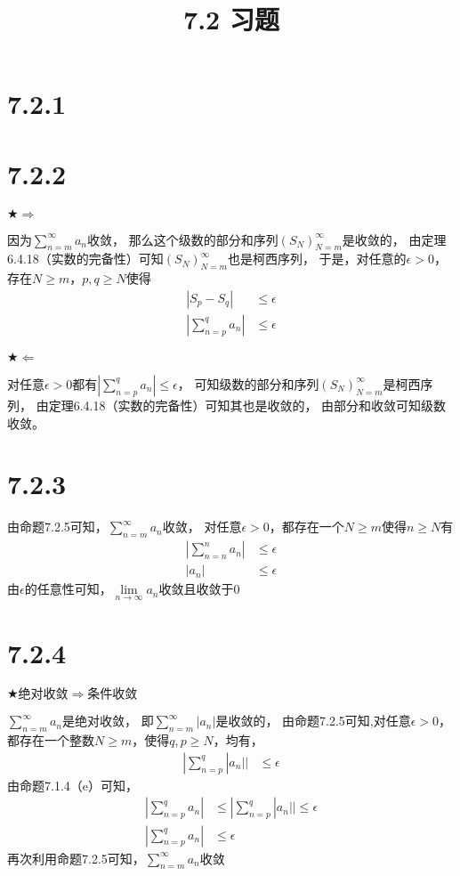 \documentclass{article}
\theoremstyle{mystyle}
\begin{document}
\title{7.2 习题}
\maketitle

\section*{7.2.1}

\section*{7.2.2}

$\bigstar \Rightarrow$

因为$\sum \limits_{n=m} ^{\infty} a_n$收敛，
那么这个级数的部分和序列$(S_N)_{N=m}^{\infty}$是收敛的，
由定理6.4.18（实数的完备性）可知$(S_N)_{N=m}^{\infty}$也是柯西序列，
于是，对任意的$\epsilon > 0$，存在$N \geq m$，$p,q \geq N$使得
\begin{align}
  |S_p - S_q|                & \leq \epsilon \\
  |\sum \limits_{n=p}^q a_n| & \leq \epsilon
\end{align}

$\bigstar \Leftarrow$

对任意$\epsilon > 0$都有$|\sum \limits_{n=p}^q a_n| \leq \epsilon$，
可知级数的部分和序列$(S_N)_{N=m}^{\infty}$是柯西序列，
由定理6.4.18（实数的完备性）可知其也是收敛的，
由部分和收敛可知级数收敛。

\section*{7.2.3}

由命题7.2.5可知，$\sum \limits_{n=m} ^{\infty} a_n$收敛，
对任意$\epsilon > 0$，都存在一个$N \geq m$使得$n \geq N$有
\begin{align*}
  |\sum \limits_{n=n}^n a_n| & \leq \epsilon \\
  |a_n|                      & \leq \epsilon
\end{align*}
由$\epsilon$的任意性可知，$\lim \limits_{n \to \infty} a_n$收敛且收敛于$0$


\section*{7.2.4}

$\bigstar \text{绝对收敛} \Rightarrow \text{条件收敛}$

$\sum \limits_{n=m} ^{\infty} a_n$是绝对收敛，
即$\sum \limits_{n=m} ^{\infty} |a_n|$是收敛的，
由命题7.2.5可知,对任意$\epsilon > 0$，都存在一个整数$N \geq m$，使得$q,p \geq N$，均有，
\begin{align*}
  |\sum \limits_{n=p}^q |a_n|| & \leq \epsilon
\end{align*}
由命题7.1.4（e）可知，
\begin{align*}
  |\sum \limits_{n=p}^q a_n| & \leq |\sum \limits_{n=p}^q |a_n|| \leq \epsilon \\
  |\sum \limits_{n=p}^q a_n| & \leq \epsilon
\end{align*}
再次利用命题7.2.5可知，$\sum \limits_{n=m} ^{\infty} a_n$收敛
\end{document}

